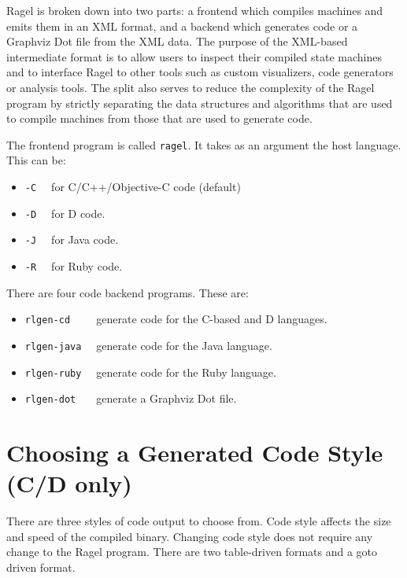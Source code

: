 \documentclass[letterpaper,11pt,oneside]{book}
\begin{document}
Ragel is broken down into two parts: a frontend which compiles machines
and emits them in an XML format, and a backend which generates code or a
Graphviz Dot file from the XML data. The purpose of the XML-based intermediate
format is to allow users to inspect their compiled state machines and to
interface Ragel to other tools such as custom visualizers, code generators or
analysis tools. The split also serves to reduce the complexity of the Ragel
program by strictly separating the data structures and algorithms that are used
to compile machines from those that are used to generate code. 

\vspace{10pt}

\noindent The frontend program is called \verb|ragel|. It takes as an argument the host
language. This can be:

\begin{itemize}
\item \verb|-C  | for C/C++/Objective-C code (default)
\item \verb|-D  | for D code.
\item \verb|-J  | for Java code.
\item \verb|-R  | for Ruby code.
\end{itemize}

\noindent There are four code backend programs. These are:

\begin{itemize}
\item \verb|rlgen-cd    | generate code for the C-based and D languages.
\item \verb|rlgen-java  | generate code for the Java language.
\item \verb|rlgen-ruby  | generate code for the Ruby language.
\item \verb|rlgen-dot   | generate a Graphviz Dot file.
\end{itemize}

\section{Choosing a Generated Code Style (C/D only)}
\label{genout}

There are three styles of code output to choose from. Code style affects the
size and speed of the compiled binary. Changing code style does not require any
change to the Ragel program. There are two table-driven formats and a goto
driven format.
\end{document}
